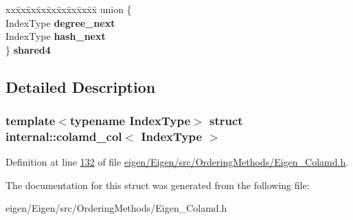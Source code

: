 \begin{DoxyCompactItemize}
\begin{tabbing}
\end{tabbing}\item 
\mbox{\label{structinternal_1_1colamd__col_a4fff94d6ed1e82c8e7be2bbc7dbbc7be}} 
\begin{tabbing}
xx\=xx\=xx\=xx\=xx\=xx\=xx\=xx\=xx\=\kill
union \{\\
\>IndexType {\bfseries degree\_next}\\
\>IndexType {\bfseries hash\_next}\\
\} {\bfseries shared4}\\

\end{tabbing}\end{DoxyCompactItemize}


\subsection{Detailed Description}
\subsubsection*{template$<$typename Index\+Type$>$\newline
struct internal\+::colamd\+\_\+col$<$ Index\+Type $>$}



Definition at line \hyperlink{eigen_2_eigen_2src_2_ordering_methods_2_eigen___colamd_8h_source_l00132}{132} of file \hyperlink{eigen_2_eigen_2src_2_ordering_methods_2_eigen___colamd_8h_source}{eigen/\+Eigen/src/\+Ordering\+Methods/\+Eigen\+\_\+\+Colamd.\+h}.



The documentation for this struct was generated from the following file\+:\begin{DoxyCompactItemize}
\item 
eigen/\+Eigen/src/\+Ordering\+Methods/\+Eigen\+\_\+\+Colamd.\+h\end{DoxyCompactItemize}
